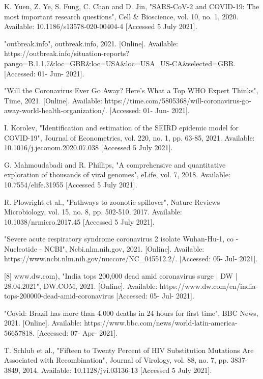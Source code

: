 \documentclass[conference,compsoc]{IEEEtran}
\begin{document}
\begin{thebibliography}{1}

K. Yuen, Z. Ye, S. Fung, C. Chan and D. Jin, "SARS-CoV-2 and COVID-19: The most important research questions", Cell \& Bioscience, vol. 10, no. 1, 2020. Available: 10.1186/s13578-020-00404-4 [Accessed 5 July 2021].

"outbreak.info", outbreak.info, 2021. [Online]. Available: https://outbreak.info/situation-reports?pango=B.1.1.7\&loc=GBR\&loc=USA\&loc=USA\_US-CA\&selected=GBR. [Accessed: 01- Jun- 2021].


"Will the Coronavirus Ever Go Away? Here's What a Top WHO Expert Thinks", Time, 2021. [Online]. Available: https://time.com/5805368/will-coronavirus-go-away-world-health-organization/. [Accessed: 01- Jun- 2021].

I. Korolev, "Identification and estimation of the SEIRD epidemic model for COVID-19", Journal of Econometrics, vol. 220, no. 1, pp. 63-85, 2021. Available: 10.1016/j.jeconom.2020.07.038 [Accessed 5 July 2021].

G. Mahmoudabadi and R. Phillips, "A comprehensive and quantitative exploration of thousands of viral genomes", eLife, vol. 7, 2018. Available: 10.7554/elife.31955 [Accessed 5 July 2021].

R. Plowright et al., "Pathways to zoonotic spillover", Nature Reviews Microbiology, vol. 15, no. 8, pp. 502-510, 2017. Available: 10.1038/nrmicro.2017.45 [Accessed 5 July 2021].

"Severe acute respiratory syndrome coronavirus 2 isolate Wuhan-Hu-1, co - Nucleotide - NCBI", Ncbi.nlm.nih.gov, 2021. [Online]. Available: https://www.ncbi.nlm.nih.gov/nuccore/NC\_045512.2/. [Accessed: 05- Jul- 2021].

[8] www.dw.com), "India tops 200,000 dead amid coronavirus surge | DW | 28.04.2021", DW.COM, 2021. [Online]. Available: https://www.dw.com/en/india-tops-200000-dead-amid-coronavirus [Accessed: 05- Jul- 2021].

"Covid: Brazil has more than 4,000 deaths in 24 hours for first time", BBC News, 2021. [Online]. Available: https://www.bbc.com/news/world-latin-america-56657818. [Accessed: 07- Apr- 2021].

T. Schlub et al., "Fifteen to Twenty Percent of HIV Substitution Mutations Are Associated with Recombination", Journal of Virology, vol. 88, no. 7, pp. 3837-3849, 2014. Available: 10.1128/jvi.03136-13 [Accessed 5 July 2021].


\end{thebibliography}
\end{document}
